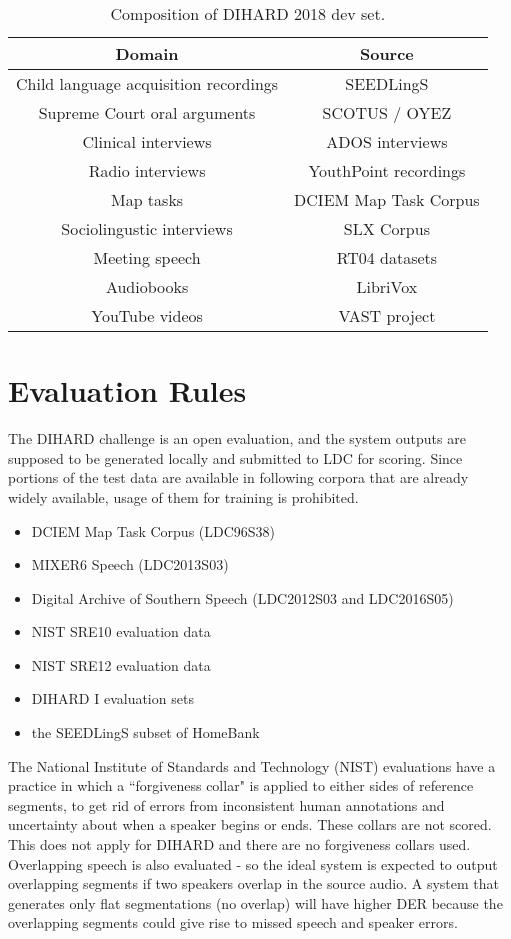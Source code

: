 \begin{table}[h]
	\centering
	\begin{tabular}{|c|c|}
		\hline
		Domain & Source \\
		\hline
		Child language acquisition recordings & SEEDLingS \\
		Supreme Court oral arguments & SCOTUS / OYEZ \\
		Clinical interviews & ADOS interviews \\
		Radio interviews & YouthPoint recordings \\
		Map tasks & DCIEM Map Task Corpus \\
		Sociolingustic interviews & SLX Corpus \\
		Meeting speech & RT04 datasets \\
		Audiobooks & LibriVox \\
		YouTube videos & VAST project \\
		\hline
	\end{tabular}
	\caption{Composition of DIHARD 2018 dev set.}
	\label{table-dihard-dev-composition}
\end{table}

\section{Evaluation Rules}
The DIHARD challenge is an open evaluation, and the system outputs are supposed to be generated locally and submitted to LDC for scoring. Since portions of the test data are available in following corpora that are already widely available, usage of them for training is prohibited.

\begin{itemize}
	\item DCIEM Map Task Corpus (LDC96S38)
	\item MIXER6 Speech (LDC2013S03)
	\item Digital Archive of Southern Speech (LDC2012S03 and LDC2016S05)
	\item NIST SRE10 evaluation data
	\item NIST SRE12 evaluation data
	\item DIHARD I evaluation sets
	\item the SEEDLingS subset of HomeBank
\end{itemize}

The National Institute of Standards and Technology (NIST) evaluations have a practice in which a ``forgiveness collar" is applied to either sides of reference segments, to get rid of errors from inconsistent human annotations and uncertainty about when a speaker begins or ends. These collars are not scored. This does not apply for DIHARD and there are no forgiveness collars used. Overlapping speech is also evaluated - so the ideal system is expected to output overlapping segments if two speakers overlap in the source audio. A system that generates only flat segmentations (no overlap) will have higher DER because the overlapping segments could give rise to missed speech and speaker errors.

